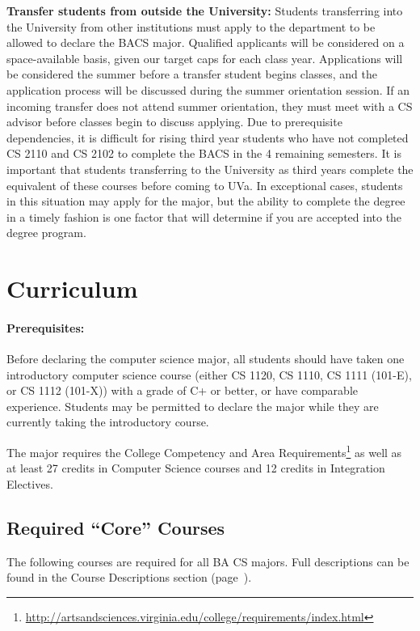 \documentclass[10pt,letter]{book}
\newcommand{\mysection}[1]{\section{#1}\renewcommand{\rightmark}{#1}}
\newcommand{\myurl}[1]{\footnote{\scriptsize\url{#1}}}
\begin{document}
{\bf Transfer students from outside the University:} Students
transferring into the University from other institutions must apply to
the department to be allowed to declare the BACS major. Qualified
applicants will be considered on a space-available basis, given our
target caps for each class year. Applications will be considered the
summer before a transfer student begins classes, and the application
process will be discussed during the summer orientation session. If an
incoming transfer does not attend summer orientation, they must meet
with a CS advisor before classes begin to discuss applying.  Due to
prerequisite dependencies, it is difficult for rising third year
students who have not completed CS 2110 and CS 2102 to complete the
BACS in the 4 remaining semesters. It is important that students
transferring to the University as third years complete the equivalent
of these courses before coming to UVa. In exceptional cases, students
in this situation may apply for the major, but the ability to complete
the degree in a timely fashion is one factor that will determine if
you are accepted into the degree program.




\mysection{Curriculum}

\paragraph{Prerequisites:}

Before declaring the computer science major, all students should have
taken one introductory computer science course (either CS 1120,
CS 1110, CS 1111 (101-E), or CS 1112 (101-X)) with a grade of C+
or better, or have comparable experience. Students may be permitted to
declare the major while they are currently taking the introductory
course.

The major requires the College Competency and Area
Requirements\myurl{http://artsandsciences.virginia.edu/college/requirements/index.html}
as well as at least 27 credits in Computer Science courses and 12
credits in Integration Electives.

\subsection{Required ``Core'' Courses}

The following courses are required for all BA CS majors.  Full
descriptions can be found in the Course Descriptions section
(page~\pageref{sec:coursedesc}).
\end{document}
